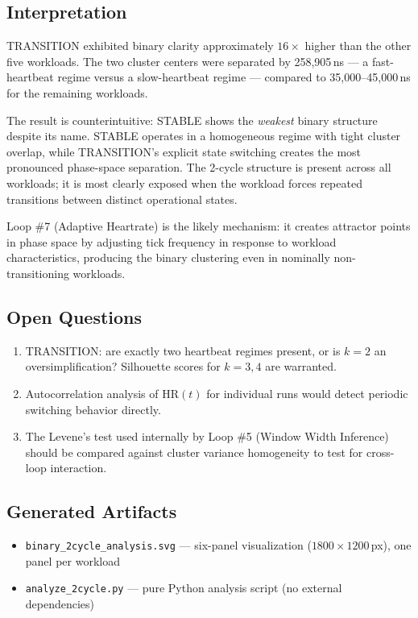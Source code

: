 \subsection{Interpretation}

TRANSITION exhibited binary clarity approximately $16\times$ higher than
the other five workloads. The two cluster centers were separated by
258{,}905\,ns — a fast-heartbeat regime versus a slow-heartbeat regime —
compared to 35{,}000--45{,}000\,ns for the remaining workloads.

The result is counterintuitive: STABLE shows the \emph{weakest} binary
structure despite its name. STABLE operates in a homogeneous regime with
tight cluster overlap, while TRANSITION's explicit state switching creates
the most pronounced phase-space separation. The 2-cycle structure is
present across all workloads; it is most clearly exposed when the workload
forces repeated transitions between distinct operational states.

Loop \#7 (Adaptive Heartrate) is the likely mechanism: it creates attractor
points in phase space by adjusting tick frequency in response to workload
characteristics, producing the binary clustering even in nominally
non-transitioning workloads.

\subsection{Open Questions}

\begin{enumerate}
  \item TRANSITION: are exactly two heartbeat regimes present, or is $k=2$
        an oversimplification? Silhouette scores for $k = 3, 4$ are
        warranted.
  \item Autocorrelation analysis of HR$(t)$ for individual runs would
        detect periodic switching behavior directly.
  \item The Levene's test used internally by Loop \#5 (Window Width
        Inference) should be compared against cluster variance homogeneity
        to test for cross-loop interaction.
\end{enumerate}

\subsection{Generated Artifacts}

\begin{itemize}
  \item \texttt{binary\_2cycle\_analysis.svg} — six-panel visualization
        ($1800 \times 1200$\,px), one panel per workload
  \item \texttt{analyze\_2cycle.py} — pure Python analysis script (no
        external dependencies)
\end{itemize}

